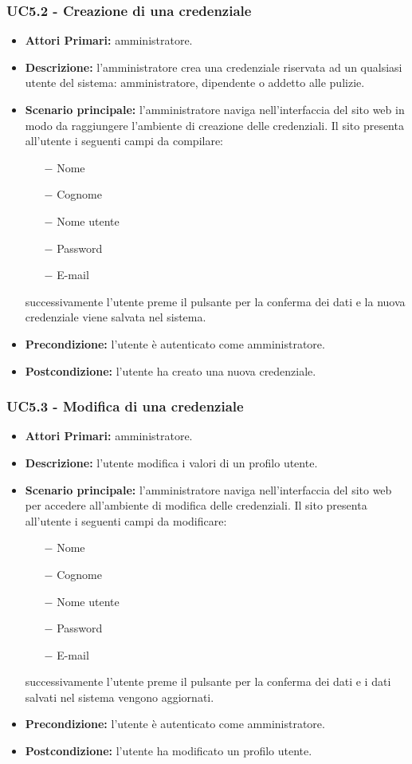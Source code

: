 \subsubsection{ UC5.2 - Creazione di una credenziale}
\begin{itemize}
	\item\textbf{Attori Primari:}
	amministratore.
	\item\textbf{Descrizione:} 
	l'amministratore crea una credenziale riservata ad un qualsiasi utente del sistema: amministratore, dipendente o addetto alle pulizie.
	\item\textbf{Scenario principale:} 
	l'amministratore naviga nell'interfaccia del sito web in modo da raggiungere l'ambiente di creazione delle credenziali.
	Il sito presenta all'utente i seguenti campi da compilare:
	\begin{itemize}
		\item[$-$] Nome
		\item[$-$] Cognome
		\item[$-$] Nome utente
		\item[$-$] Password
		\item[$-$] E-mail
	\end{itemize}
	successivamente l'utente preme il pulsante per la conferma dei dati e la nuova credenziale viene salvata nel sistema.
	\item\textbf{Precondizione:} 
	l'utente è autenticato come amministratore.
	\item\textbf{Postcondizione:}
	l'utente ha creato una nuova credenziale.
\end{itemize}

\subsubsection{ UC5.3 - Modifica di una credenziale}
\begin{itemize}
	\item\textbf{Attori Primari:} 
	amministratore.
	\item\textbf{Descrizione:} 
	l'utente modifica i valori di un profilo utente.
	\item\textbf{Scenario principale:} 
	l'amministratore naviga nell'interfaccia del sito web per accedere all'ambiente di modifica delle credenziali.
	Il sito presenta all'utente i seguenti campi da modificare:
	\begin{itemize}
		\item[$-$] Nome
		\item[$-$] Cognome
		\item[$-$] Nome utente
		\item[$-$] Password
		\item[$-$] E-mail
	\end{itemize}
	successivamente l'utente preme il pulsante per la conferma dei dati e i dati salvati nel sistema vengono aggiornati.
	\item\textbf{Precondizione:} 
	l'utente è autenticato come amministratore.
	\item\textbf{Postcondizione:}
	l'utente ha modificato un profilo utente.
\end{itemize}


